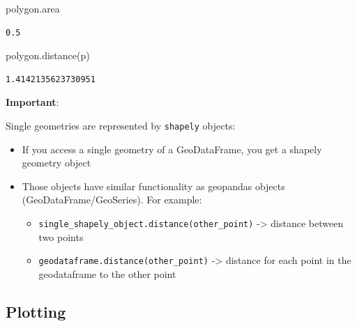 \documentclass[
  letterpaper,
  DIV=11,
  numbers=noendperiod]{scrreprt}
\newenvironment{Shaded}{\begin{snugshade}}{\end{snugshade}}
\newcommand{\NormalTok}[1]{\textcolor[rgb]{0.00,0.23,0.31}{#1}}
\providecommand{\tightlist}{%
  \setlength{\itemsep}{0pt}\setlength{\parskip}{0pt}}\usepackage{longtable,booktabs,array}
\begin{document}
\begin{Shaded}
\begin{Highlighting}[]
\NormalTok{polygon.area}
\end{Highlighting}
\end{Shaded}

\begin{verbatim}
0.5
\end{verbatim}

\begin{Shaded}
\begin{Highlighting}[]
\NormalTok{polygon.distance(p)}
\end{Highlighting}
\end{Shaded}

\begin{verbatim}
1.4142135623730951
\end{verbatim}

\textbf{Important}:

Single geometries are represented by \texttt{shapely} objects:

\begin{itemize}
\tightlist
\item
  If you access a single geometry of a GeoDataFrame, you get a shapely
  geometry object
\item
  Those objects have similar functionality as geopandas objects
  (GeoDataFrame/GeoSeries). For example:

  \begin{itemize}
  \tightlist
  \item
    \texttt{single\_shapely\_object.distance(other\_point)}
    -\textgreater{} distance between two points
  \item
    \texttt{geodataframe.distance(other\_point)} -\textgreater{}
    distance for each point in the geodataframe to the other point
  \end{itemize}
\end{itemize}

\subsection{Plotting}\label{plotting}
\end{document}
